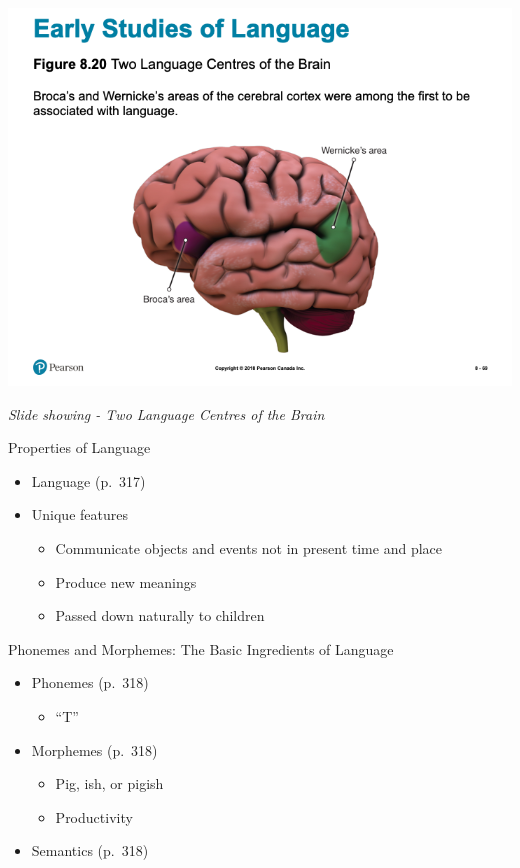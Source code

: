 \documentclass[
]{book}
\providecommand{\tightlist}{%
  \setlength{\itemsep}{0pt}\setlength{\parskip}{0pt}}
\begin{document}
\includegraphics{assets/unit_1/slide_69.png}

\emph{Slide showing - Two Language Centres of the Brain}

Properties of Language

\begin{itemize}
\tightlist
\item
  Language (p.~317)\\
\item
  Unique features

  \begin{itemize}
  \tightlist
  \item
    Communicate objects and events not in present time and place\\
  \item
    Produce new meanings\\
  \item
    Passed down naturally to children
  \end{itemize}
\end{itemize}

Phonemes and Morphemes: The Basic Ingredients of Language

\begin{itemize}
\tightlist
\item
  Phonemes (p.~318)

  \begin{itemize}
  \tightlist
  \item
    ``T''
  \end{itemize}
\item
  Morphemes (p.~318)

  \begin{itemize}
  \tightlist
  \item
    Pig, ish, or pigish\\
  \item
    Productivity
  \end{itemize}
\item
  Semantics (p.~318)
\end{itemize}
\end{document}
